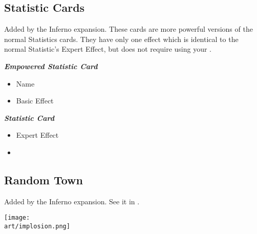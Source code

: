 \begin{multicols*}{2}
\subsection*{ Statistic Cards}
Added by the Inferno expansion.
These cards are more powerful versions of the normal Statistics cards.
They have only one effect which is identical to the normal Statistic's Expert Effect, but does not require using your .

\begin{scriptsize}
\end{scriptsize}
\vspace{-2em}
\begin{multicols}{2}
  \centering
  \footnotesize{\textbf{\textit{\textcolor{darkcandyapplered}{Empowered Statistic Card}}}}
  \scriptsize
  \begin{itemize}
    \item[\textbf{1.}] Name
    \item[\textbf{2.}] Basic Effect
  \end{itemize}
  \columnbreak
  \footnotesize
  \textbf{\textit{\textcolor{darkcandyapplered}{Statistic Card \phantom{Empowered}}}}
  \begin{itemize}
    \item[\textbf{3.}] Expert Effect
    \item[\textbf{\phantom{.}}] \phantom{.}
  \end{itemize}
\end{multicols}

\subsection*{Random Town}
Added by the Inferno expansion. See it in .


\vfill
\hspace{2em}
\texttt{[image: \\art/implosion.png]}
\vfill

\end{multicols*}
